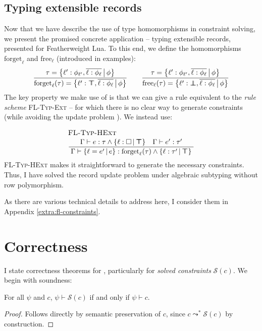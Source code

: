 \subsection{Typing extensible records}
Now that we have describe the use of type homomorphisms in constraint solving, we present the promised concrete application -- typing extensible records, presented for Featherweight Lua. To this end, we define the homomorphisms $\mathrm{forget}_\ell$ and $\mathrm{free}_\ell$ (introduced in examples):
$$ 
\dfrac
  {\tau = \flext{\ell' : \phi_{\ell'},  \overline{\ell : \phi_\ell}}{\phi}}
  {\mathrm{forget}_\ell(\tau) = \flext{\ell' : \flftop,  \overline{\ell : \phi_\ell}}{\phi}}
\qquad 
\dfrac
  {\tau = \flext{\ell' : \phi_{\ell'},  \overline{\ell : \phi_\ell}}{\phi}}
  {\mathrm{free}_\ell(\tau) = \flext{\ell' : \flfbot,  \overline{\ell : \phi_\ell}}{\phi}}
$$
The key property we make use of is that we can give a rule equivalent to the \emph{rule scheme} \textsc{FL-Typ-Ext} -- for which there is no clear way to generate constraints (while avoiding the update problem \cite{operations-on-records}). We instead use:
$$ 
\irule{FL-Typ-HExt}{\Gamma \vdash e : \tau \meet \flext{\ell : \flabsent}{\flftop} \quad \Gamma \vdash e' : \tau'}{\Gamma \vdash \flext{\ell = e'}{e} : \mathrm{forget}_\ell(\tau) \meet \flext{\ell : \tau'}{\flftop}}
$$
\textsc{FL-Typ-HExt} makes it straightforward to generate the necessary constraints.
Thus, I have solved the record update problem under algebraic subtyping without row polymorphism.

As there are various technical details to address here, I consider them in Appendix \ref{extra:fl-constraints}.

\section{Correctness}
\label{sec:correctness}

I state correctness theorems for \inference{}, particularly for \emph{solved constraints} $\mathcal S(c)$. We begin with soundness:
\begin{theorem}[Soundness]
    For all $\psi$ and $c$, $\psi \vdash \mathcal S(c)$ if and only if $\psi \vdash c$.
\end{theorem}
\begin{proof}
    Follows directly by semantic preservation of $c$, since $c \leadsto^* \mathcal S(c)$ by construction.
\end{proof}

